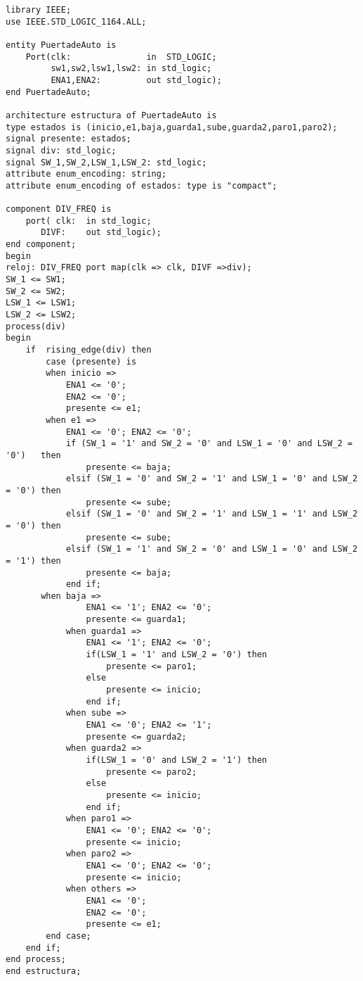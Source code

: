 \documentclass{article}
\begin{document}
\begin{mdframed}[style=topbottomframe]
\begin{lstlisting}[caption={Máquina de estados},label={lst:state_machine}]
library IEEE;
use IEEE.STD_LOGIC_1164.ALL;

entity PuertadeAuto is
	Port(clk:               in  STD_LOGIC;
         sw1,sw2,lsw1,lsw2: in std_logic;
         ENA1,ENA2:         out std_logic);
end PuertadeAuto;

architecture estructura of PuertadeAuto is
type estados is (inicio,e1,baja,guarda1,sube,guarda2,paro1,paro2);
signal presente: estados;
signal div: std_logic;
signal SW_1,SW_2,LSW_1,LSW_2: std_logic;
attribute enum_encoding: string;
attribute enum_encoding of estados: type is "compact";

component DIV_FREQ is
	port( clk:	in std_logic;
	   DIVF:	out std_logic);
end component;
begin
reloj: DIV_FREQ port map(clk => clk, DIVF =>div);
SW_1 <= SW1;
SW_2 <= SW2;
LSW_1 <= LSW1;
LSW_2 <= LSW2;
process(div)
begin
	if  rising_edge(div) then
		case (presente) is
		when inicio => 
			ENA1 <= '0';
			ENA2 <= '0';
			presente <= e1;
		when e1 =>
			ENA1 <= '0'; ENA2 <= '0';
			if (SW_1 = '1' and SW_2 = '0' and LSW_1 = '0' and LSW_2 = '0')   then
				presente <= baja;
			elsif (SW_1 = '0' and SW_2 = '1' and LSW_1 = '0' and LSW_2 = '0') then
				presente <= sube;
			elsif (SW_1 = '0' and SW_2 = '1' and LSW_1 = '1' and LSW_2 = '0') then
				presente <= sube;
			elsif (SW_1 = '1' and SW_2 = '0' and LSW_1 = '0' and LSW_2 = '1') then
				presente <= baja;
			end if;
       when baja =>
    			ENA1 <= '1'; ENA2 <= '0';
    			presente <= guarda1;
    		when guarda1 =>
    			ENA1 <= '1'; ENA2 <= '0';
    			if(LSW_1 = '1' and LSW_2 = '0') then
    				presente <= paro1;
    			else
    				presente <= inicio;
    			end if;
    		when sube =>
    			ENA1 <= '0'; ENA2 <= '1';
    			presente <= guarda2;
    		when guarda2 =>
    			if(LSW_1 = '0' and LSW_2 = '1') then
    				presente <= paro2;
    			else
    				presente <= inicio;
    			end if;
    		when paro1 =>
    			ENA1 <= '0'; ENA2 <= '0';
    			presente <= inicio;
    		when paro2 =>
    			ENA1 <= '0'; ENA2 <= '0';
    			presente <= inicio;
    		when others =>
    			ENA1 <= '0';
    			ENA2 <= '0';
    			presente <= e1;
		end case;
	end if;
end process;
end estructura;
\end{lstlisting}
\end{mdframed}
\end{document}
